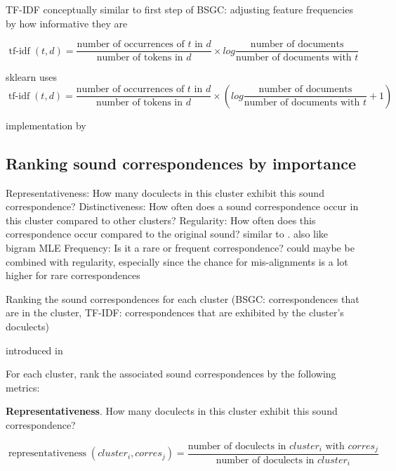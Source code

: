 \documentclass[a4paper]{article}
\begin{document}
TF-IDF conceptually similar to first step of BSGC: adjusting feature frequencies by how informative they are

\begin{equation*}
\operatorname{tf-idf}(t, d) =
\frac{\text{number of occurrences of } t \text{ in } d}
{\text{number of tokens in } d}
\times
log
\frac{\text{number of documents}}
{\text{number of documents with } t}
\end{equation*}

sklearn uses 
\begin{equation*}
\operatorname{tf-idf}(t, d) =
\frac{\text{number of occurrences of } t \text{ in } d}
{\text{number of tokens in } d}
\times
(
log
\frac{\text{number of documents}}
{\text{number of documents with } t}
+ 1)
\end{equation*}

implementation by \cite{pedregosa2011scikit-learn:}

\subsection{Ranking sound correspondences by importance}

Representativeness: How many doculects in this cluster exhibit this sound correspondence? \citep{wieling2011bipartite}
Distinctiveness: How often does a sound correspondence occur in this cluster compared to other clusters? \citep{wieling2011bipartite}
Regularity: How often does this correspondence occur compared to the original sound? similar to \citet{prokic2013combining}. also like bigram MLE
Frequency: Is it a rare or frequent correspondence? could maybe be combined with regularity, especially since the chance for mis-alignments is a lot higher for rare correspondences

Ranking the sound correspondences for each cluster
(BSGC: correspondences that are in the cluster,
TF-IDF: correspondences that are exhibited by the cluster's doculects)

introduced in \citet{wieling2011bipartite}

For each cluster, rank the associated sound correspondences by the following metrics:

\textbf{Representativeness}.
How many doculects in this cluster exhibit this sound correspondence?

\begin{equation*}
\operatorname{representativeness}(cluster_i, corres_j) = 
\frac{\text{number of doculects in } cluster_i \text{ with }  corres_j}
{\text{number of doculects in }  cluster_i}
\end{equation*}
\end{document}
